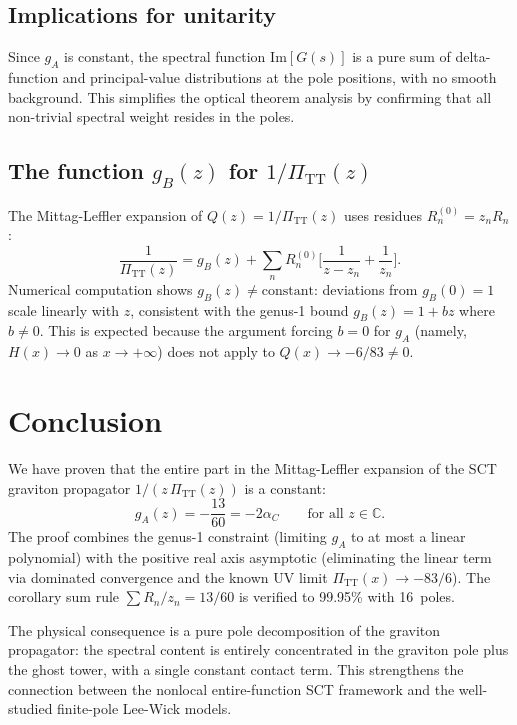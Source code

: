 \documentclass[11pt,a4paper]{article}
\newcommand{\PiTT}{\Pi_{\mathrm{TT}}}
\newcommand{\Imag}{\mathrm{Im}}
\begin{document}
\subsection{Implications for unitarity}

Since $g_A$ is constant, the spectral function $\Imag[G(s)]$ is a
pure sum of delta-function and principal-value distributions at the
pole positions, with no smooth background.  This simplifies the
optical theorem analysis by confirming that all
non-trivial spectral weight resides in the poles.

\subsection{The function $g_B(z)$ for $1/\PiTT(z)$}

The Mittag-Leffler expansion of $Q(z) = 1/\PiTT(z)$ uses residues
$R_n^{(0)} = z_n R_n$:
\[
  \frac{1}{\PiTT(z)} = g_B(z) + \sum_n R_n^{(0)}
    \biggl[\frac{1}{z - z_n} + \frac{1}{z_n}\biggr].
\]
Numerical computation shows $g_B(z) \neq \text{constant}$: deviations
from $g_B(0) = 1$ scale linearly with $z$, consistent with the genus-1
bound $g_B(z) = 1 + bz$ where $b \neq 0$.  This is expected because the
argument forcing $b = 0$ for $g_A$ (namely, $H(x) \to 0$ as
$x \to +\infty$) does not apply to $Q(x) \to -6/83 \neq 0$.

\section{Conclusion}
\label{sec:conclusion}

We have proven that the entire part in the Mittag-Leffler expansion of
the SCT graviton propagator $1/(z\,\PiTT(z))$ is a constant:
\[
  \boxed{g_A(z) = -\frac{13}{60} = -2\alpha_C
    \qquad \text{for all } z \in \mathbb{C}.}
\]
The proof combines the genus-1 constraint (limiting $g_A$ to at most
a linear polynomial) with the positive real axis asymptotic (eliminating
the linear term via dominated convergence and the known UV limit
$\PiTT(x) \to -83/6$).  The corollary sum rule
$\sum R_n/z_n = 13/60$ is verified to 99.95\% with 16~poles.

The physical consequence is a pure pole decomposition of the graviton
propagator: the spectral content is entirely concentrated in the
graviton pole plus the ghost tower, with a single constant contact
term.  This strengthens the connection between the nonlocal
entire-function SCT framework and the well-studied finite-pole
Lee-Wick models.
\end{document}
